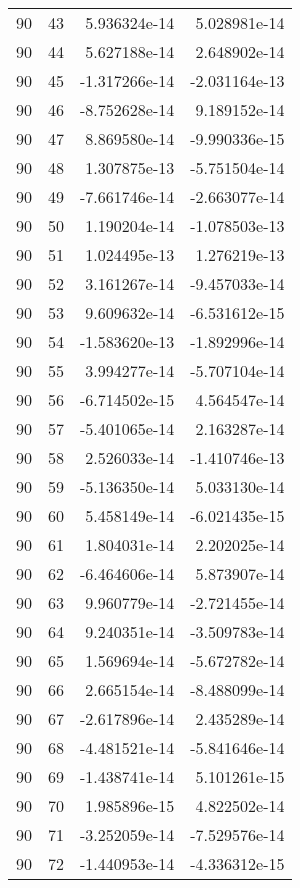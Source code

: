 \begin{tabular}{rrrr}
  90 &   43 &  5.936324e-14 &  5.028981e-14 \\
  90 &   44 &  5.627188e-14 &  2.648902e-14 \\
  90 &   45 & -1.317266e-14 & -2.031164e-13 \\
  90 &   46 & -8.752628e-14 &  9.189152e-14 \\
  90 &   47 &  8.869580e-14 & -9.990336e-15 \\
  90 &   48 &  1.307875e-13 & -5.751504e-14 \\
  90 &   49 & -7.661746e-14 & -2.663077e-14 \\
  90 &   50 &  1.190204e-14 & -1.078503e-13 \\
  90 &   51 &  1.024495e-13 &  1.276219e-13 \\
  90 &   52 &  3.161267e-14 & -9.457033e-14 \\
  90 &   53 &  9.609632e-14 & -6.531612e-15 \\
  90 &   54 & -1.583620e-13 & -1.892996e-14 \\
  90 &   55 &  3.994277e-14 & -5.707104e-14 \\
  90 &   56 & -6.714502e-15 &  4.564547e-14 \\
  90 &   57 & -5.401065e-14 &  2.163287e-14 \\
  90 &   58 &  2.526033e-14 & -1.410746e-13 \\
  90 &   59 & -5.136350e-14 &  5.033130e-14 \\
  90 &   60 &  5.458149e-14 & -6.021435e-15 \\
  90 &   61 &  1.804031e-14 &  2.202025e-14 \\
  90 &   62 & -6.464606e-14 &  5.873907e-14 \\
  90 &   63 &  9.960779e-14 & -2.721455e-14 \\
  90 &   64 &  9.240351e-14 & -3.509783e-14 \\
  90 &   65 &  1.569694e-14 & -5.672782e-14 \\
  90 &   66 &  2.665154e-14 & -8.488099e-14 \\
  90 &   67 & -2.617896e-14 &  2.435289e-14 \\
  90 &   68 & -4.481521e-14 & -5.841646e-14 \\
  90 &   69 & -1.438741e-14 &  5.101261e-15 \\
  90 &   70 &  1.985896e-15 &  4.822502e-14 \\
  90 &   71 & -3.252059e-14 & -7.529576e-14 \\
  90 &   72 & -1.440953e-14 & -4.336312e-15 \\

\end{tabular}
